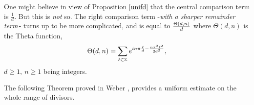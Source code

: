 \documentclass[11pt,draft,reqno]{amsart}
\theoremstyle{definition}
\theoremstyle{remarks}
\numberwithin{equation}{section}
\def\P{{\mathcal P}}
\def\P{{\mathbb P}}
\def\Z{{\mathbb Z}}
\begin{document}
  One might believe in view of Proposition \ref{unifd} that the central comparison term  is $\frac1d$. But this is {\it not} so. The right comparison term -{\it with a sharper remainder term\,}- turns up to be more complicated, and is equal to ${\Theta(d,n)\over d}$ where $\Theta(d,n)$ is the Theta     function, 
  \begin{equation} \label{Theta}\displaystyle{ \Theta (d,n)  =  \sum_{\ell\in \Z} e^{in\pi{\ell\over   d }-{n\pi^2\ell^2\over 2 d^2}},     }
   \end{equation}
  $d\ge 1,\ n\ge 1$ being integers.  
\medskip \par The following Theorem proved in Weber \cite{W1}, 
provides a uniform estimate on the whole range of  divisors.
\end{document}

